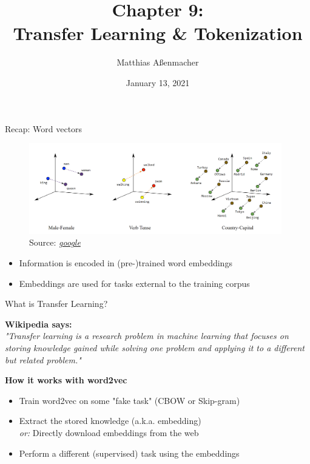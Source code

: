 \documentclass[]{beamer}
\title[Transfer Learning \& Tokenization]{Chapter 9: \\ Transfer Learning \& Tokenization}
\author{Matthias Aßenmacher}
\date{January 13, 2021}
\begin{document}
\begin{frame}
	\titlepage
\end{frame}



\begin{frame}{Recap: Word vectors}
	\begin{figure}
		\centering
		\includegraphics[width = 11cm]{figure/linear-relationships.png}\\ 
		\footnotesize{Source:} \href{https://developers.google.com/machine-learning/crash-course/embeddings/translating-to-a-lower-dimensional-space}{\footnotesize \it google}
	\end{figure}

	\begin{itemize}
		\item Information is encoded in (pre-)trained word embeddings
		\item Embeddings are used for tasks external to the training corpus
	\end{itemize}
\end{frame}



\begin{frame}{What is Transfer Learning?}

	\textbf{Wikipedia says:} \\
    \textit{"Transfer learning is a research problem in machine learning that focuses on storing knowledge gained while solving one problem and applying it to a different but related problem."}\\
		
	\vspace{.5cm}
	
	\textbf{How it works with word2vec}
	
	\begin{itemize}
		\item Train word2vec on some "fake task" (CBOW or Skip-gram)
		\item Extract the stored knowledge (a.k.a. embedding)\\
					\textit{or:} Directly download embeddings from the web 
		\item Perform a different (supervised) task using the embeddings
	\end{itemize}
\end{frame}
\end{document}

